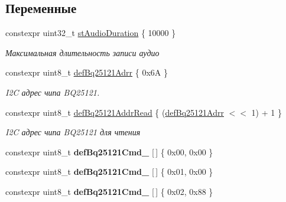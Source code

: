 \subsection*{Переменные}
\begin{DoxyCompactItemize}
\item 
\mbox{\label{namespaceunit_a3a82b0d0086859e1e04e0878fb932db3}} 
constexpr uint32\+\_\+t \hyperlink{namespaceunit_a3a82b0d0086859e1e04e0878fb932db3}{st\+Audio\+Duration} \{ 10000 \}
\begin{DoxyCompactList}\small\item\em Максимальная длительность записи аудио \end{DoxyCompactList}\item 
\mbox{\label{namespaceunit_af46d6c2767dafd308cf474c40fbeb8ec}} 
constexpr uint8\+\_\+t \hyperlink{namespaceunit_af46d6c2767dafd308cf474c40fbeb8ec}{def\+Bq25121\+Adrr} \{ 0x6\+A \}
\begin{DoxyCompactList}\small\item\em I2C адрес чипа B\+Q25121. \end{DoxyCompactList}\item 
\mbox{\label{namespaceunit_a288a496e8f8769855083c088ae7560b9}} 
constexpr uint8\+\_\+t \hyperlink{namespaceunit_a288a496e8f8769855083c088ae7560b9}{def\+Bq25121\+Addr\+Read} \{ (\hyperlink{namespaceunit_af46d6c2767dafd308cf474c40fbeb8ec}{def\+Bq25121\+Adrr} $<$$<$ 1) + 1 \}
\begin{DoxyCompactList}\small\item\em I2C адрес чипа B\+Q25121 для чтения \end{DoxyCompactList}\item 
\mbox{\label{namespaceunit_ab0580f2a23a63c34bfb8d724d6a62b5a}} 
constexpr uint8\+\_\+t {\bfseries def\+Bq25121\+Cmd\+\_} \mbox{[}$\,$\mbox{]} \{ 0x00, 0x00 \}
\item 
\mbox{\label{namespaceunit_aa36516696f6f93e324939647b1a827f7}} 
constexpr uint8\+\_\+t {\bfseries def\+Bq25121\+Cmd\+\_} \mbox{[}$\,$\mbox{]} \{ 0x01, 0x00 \}
\item 
\mbox{\label{namespaceunit_a677ac2bb5fbf6c6e9c105088ac9d5414}} 
constexpr uint8\+\_\+t {\bfseries def\+Bq25121\+Cmd\+\_} \mbox{[}$\,$\mbox{]} \{ 0x02, 0x88 \}
$$
\end{DoxyCompactItemize}
